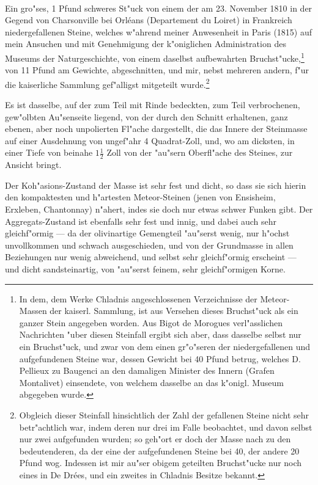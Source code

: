 \documentclass[a4paper, 11pt, oneside, german]{article}
\begin{document}
\paragraph{}
Ein gro"ses, 1 Pfund schweres St"uck von einem der am 23. November 1810 in der Gegend von Charsonville bei Orléans (Departement du Loiret) in Frankreich niedergefallenen Steine, welches w"ahrend meiner Anwesenheit in Paris (1815) auf mein Ansuchen und mit Genehmigung der k"oniglichen Administration des Museums der Naturgeschichte, von einem daselbst aufbewahrten Bruchst"ucke,\footnote{In dem, dem Werke Chladnis angeschlossenen Verzeichnisse der Meteor-Massen der kaiserl. Sammlung, ist aus Versehen dieses Bruchst"uck als ein ganzer Stein angegeben worden. Aus Bigot de Morogues verl"asslichen Nachrichten "uber diesen Steinfall ergibt sich aber, dass dasselbe selbst nur ein Bruchst"uck, und zwar von dem einen gr"o"seren der niedergefallenen und aufgefundenen Steine war, dessen Gewicht bei 40 Pfund betrug, welches D. Pellieux zu Baugenci an den damaligen Minister des Innern (Grafen Montalivet) einsendete, von welchem dasselbe an das k"onigl. Museum abgegeben wurde.} von 11 Pfund am Gewichte, abgeschnitten, und mir, nebst mehreren andern, f"ur die kaiserliche Sammlung gef"alligst mitgeteilt wurde.\footnote{Obgleich dieser Steinfall hinsichtlich der Zahl der gefallenen Steine nicht sehr betr"achtlich war, indem deren nur drei im Falle beobachtet, und davon selbst nur zwei aufgefunden wurden; so geh"ort er doch der Masse nach zu den bedeutenderen, da der eine der aufgefundenen Steine bei 40, der andere 20 Pfund wog. Indessen ist mir au"ser obigem geteilten Bruchst"ucke nur noch eines in De Drées, und ein zweites in Chladnis Besitze bekannt.}

Es ist dasselbe, auf der zum Teil mit Rinde bedeckten, zum Teil verbrochenen, gew"olbten Au"senseite liegend, von der durch den Schnitt erhaltenen, ganz ebenen, aber noch unpolierten Fl"ache dargestellt, die das Innere der Steinmasse auf einer Ausdehnung von ungef"ahr 4 Quadrat-Zoll, und, wo am dicksten, in einer Tiefe von beinahe $1\frac{1}{2}$ Zoll von der "au"sern Oberfl"ache des Steines, zur Ansicht bringt.

Der Koh"asions-Zustand der Masse ist sehr fest und dicht, so dass sie sich hierin den kompaktesten und h"artesten Meteor-Steinen (jenen von Ensisheim, Erxleben, Chantonnay) n"ahert, indes sie doch nur etwas schwer Funken gibt. Der Aggregats-Zustand ist ebenfalls sehr fest und innig, und dabei auch sehr gleichf"ormig --- da der olivinartige Gemengteil "au"serst wenig, nur h"ochst unvollkommen und schwach ausgeschieden, und von der Grundmasse in allen Beziehungen nur wenig abweichend, und selbst sehr gleichf"ormig erscheint --- und dicht sandsteinartig, von "au"serst feinem, sehr gleichf"ormigen Korne.
\end{document}
